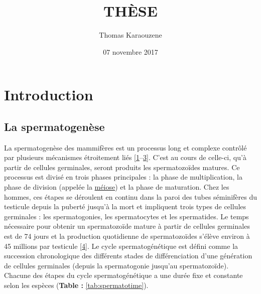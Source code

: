 \documentclass[12pt,twoside]{reedthesis}
\title{THÈSE}
\author{Thomas Karaouzene}
\date{07 novembre 2017}
\theoremstyle{definition}
\theoremstyle{definition}
\theoremstyle{remark}
\begin{document}
      \maketitle
  
  \frontmatter %
  \pagestyle{empty} %

  
  
      \hypersetup{linkcolor=black}
    \setcounter{tocdepth}{3}
    \tableofcontents
  
      \listoftables
  
      \listoffigures
  
  
  
  \mainmatter %
  \pagestyle{fancyplain} %

  \chapter{Introduction}\label{introInf}
  
  \section{La spermatogenèse}\label{la-spermatogenese}
  
  La spermatogenèse des mammifères est un processus long et complexe
  contrôlé par plusieurs mécanismes étroitement liés
  {[}\protect\hyperlink{ref-Gnessi1997}{1}--\protect\hyperlink{ref-KIERSZENBAUM1994}{3}{]}.
  C'est au cours de celle-ci, qu'à partir de cellules germinales, seront
  produits les spermatozoïdes matures. Ce processus est divisé en trois
  phases principales : la phase de multiplication, la phase de division
  (appelée la \protect\hyperlink{meiose}{méiose}) et la phase de
  maturation. Chez les hommes, ces étapes se déroulent en continu dans la
  paroi des tubes séminifères du testicule depuis la puberté jusqu'à la
  mort et impliquent trois types de cellules germinales : les
  spermatogonies, les spermatocytes et les spermatides. Le temps
  nécessaire pour obtenir un spermatozoïde mature à partir de cellules
  germinales est de 74 jours et la production quotidienne de
  spermatozoïdes s'élève environ à 45 millions par testicule
  {[}\protect\hyperlink{ref-Johnson1980}{4}{]}. Le cycle spermatogénétique
  est défini comme la succession chronologique des différents stades de
  différenciation d'une génération de cellules germinales (depuis la
  spermatogonie jusqu'au spermatozoïde). Chacune des étapes du cycle
  spermatogénétique a une durée fixe et constante selon les espèces
  (\textbf{Table : }\ref{tab:spermatotime}).
  
\end{document}
